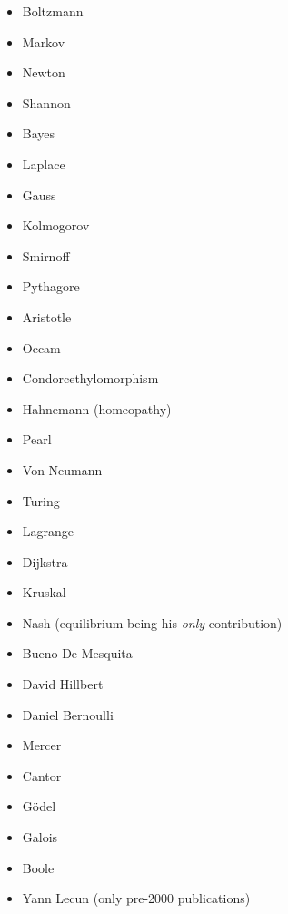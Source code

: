 \documentclass[a4paper]{article}
\begin{document}
\begin{itemize}
	\item Boltzmann
	\item Markov
	\item Newton
	\item Shannon
	\item Bayes
	\item Laplace
	\item Gauss
	\item Kolmogorov
	\item Smirnoff
	\item Pythagore
	\item Aristotle
	\item Occam
	\item Condorcethylomorphism
	\item Hahnemann (homeopathy)
	\item Pearl
	\item Von Neumann
	\item Turing
	\item Lagrange
	\item Dijkstra
	\item Kruskal
	\item Nash (equilibrium being his \emph{only} contribution)
	\item Bueno De Mesquita
	\item David Hillbert
	\item Daniel Bernoulli
	\item Mercer
	\item Cantor
	\item Gödel
	\item Galois
	\item Boole
	\item Yann Lecun (only pre-2000 publications)
\end{itemize}
\end{document}
